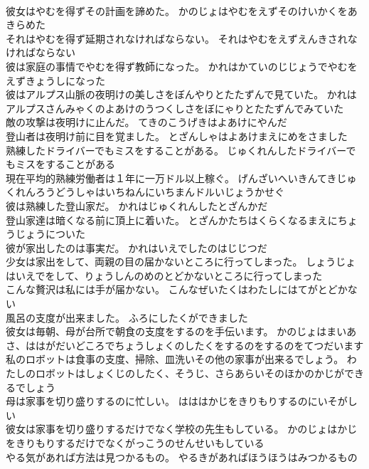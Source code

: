 \documentclass[8pt]{extreport}
\begin{document}
\begin{CJK}{UTF8}{min}
\\	彼女はやむを得ずその計画を諦めた。	かのじょはやむをえずそのけいかくをあきらめた 
\\	それはやむを得ず延期されなければならない。	それはやむをえずえんきされなければならない 
\\	彼は家庭の事情でやむを得ず教師になった。	かれはかていのじじょうでやむをえずきょうしになった 
\\	彼はアルプス山脈の夜明けの美しさをぼんやりとたたずんで見ていた。	かれはアルプスさんみゃくのよあけのうつくしさをぼにゃりとたたずんでみていた 
\\	敵の攻撃は夜明けに止んだ。	てきのこうげきはよあけにやんだ 
\\	登山者は夜明け前に目を覚ました。	とざんしゃはよあけまえにめをさました 
\\	熟練したドライバーでもミスをすることがある。	じゅくれんしたドライバーでもミスをすることがある 
\\	現在平均的熟練労働者は１年に一万ドル以上稼ぐ。	げんざいへいきんてきじゅくれんろうどうしゃはいちねんにいちまんドルいじょうかせぐ 
\\	彼は熟練した登山家だ。	かれはじゅくれんしたとざんかだ 
\\	登山家達は暗くなる前に頂上に着いた。	とざんかたちはくらくなるまえにちょうじょうについた 
\\	彼が家出したのは事実だ。	かれはいえでしたのはじじつだ 
\\	少女は家出をして、両親の目の届かないところに行ってしまった。	しょうじょはいえでをして、りょうしんのめのとどかないところに行ってしまった 
\\	こんな贅沢は私には手が届かない。	こんなぜいたくはわたしにはてがとどかない 
\\	風呂の支度が出来ました。	ふろにしたくができました 
\\	彼女は毎朝、母が台所で朝食の支度をするのを手伝います。	かのじょはまいあさ、ははがだいどころでちょうしょくのしたくをするのをするのをてつだいます 
\\	私のロボットは食事の支度、掃除、皿洗いその他の家事が出来るでしょう。	わたしのロボットはしょくじのしたく、そうじ、さらあらいそのほかのかじができるでしょう 
\\	母は家事を切り盛りするのに忙しい。	はははかじをきりもりするのにいそがしい 
\\	彼女は家事を切り盛りするだけでなく学校の先生もしている。	かのじょはかじをきりもりするだけでなくがっこうのせんせいもしている 
\\	やる気があれば方法は見つかるもの。	やるきがあればほうほうはみつかるもの 

\end{CJK}
\end{document}
